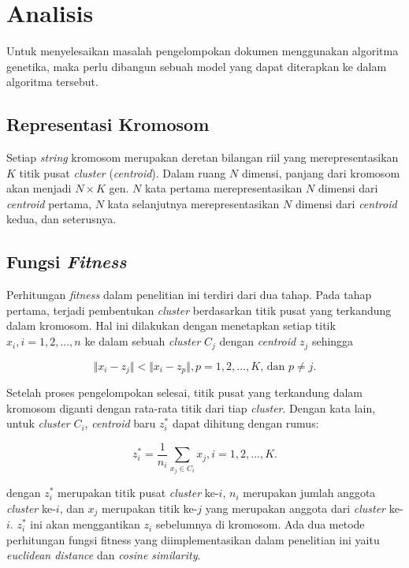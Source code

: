 \chapter{Analisis}
\label{chap:analisis}

Untuk menyelesaikan masalah pengelompokan dokumen menggunakan algoritma genetika, maka perlu dibangun sebuah model yang dapat diterapkan ke dalam algoritma tersebut.

\section{Representasi Kromosom}
Setiap \textit{string} kromosom merupakan deretan bilangan riil yang merepresentasikan $K$ titik pusat \textit{cluster} (\textit{centroid}). Dalam ruang $N$ dimensi, panjang dari kromosom akan menjadi $N\times K$ gen. $N$ kata pertama merepresentasikan $N$ dimensi dari \textit{centroid} pertama, $N$ kata selanjutnya merepresentasikan $N$ dimensi dari \textit{centroid} kedua, dan seterusnya.

\section{Fungsi \textit{Fitness}}
Perhitungan \textit{fitness} dalam penelitian ini terdiri dari dua tahap. Pada tahap pertama, terjadi pembentukan \textit{cluster} berdasarkan titik pusat yang terkandung dalam kromosom. Hal ini dilakukan dengan menetapkan setiap titik $x_i,i=1,2, ... ,n$ ke dalam sebuah \textit{cluster} $C_j$ dengan \textit{centroid} $z_j$ sehingga

\begin{equation}
\Vert x_i-z_j \Vert < \Vert x_i-z_p \Vert , p=1,2, ... ,K \mbox{, dan } p \neq j.
\end{equation}

Setelah proses pengelompokan selesai, titik pusat yang terkandung dalam kromosom diganti dengan rata-rata titik dari tiap \textit{cluster}. Dengan kata lain, untuk \textit{cluster} $C_i$, \textit{centroid} baru $z_i^*$ dapat dihitung dengan rumus:

\begin{equation}
z_i^*=\frac{1}{n_i} \sum_{x_j\in C_i} x_j,   i=1,2, ... ,K.
\end{equation}

dengan $z_i^*$ merupakan titik pusat \textit{cluster} ke-$i$, $n_i$ merupakan jumlah anggota \textit{cluster} ke-$i$, dan $x_j$ merupakan titik ke-$j$ yang merupakan anggota dari \textit{cluster} ke-$i$. $z_i^*$ ini akan menggantikan $z_i$ sebelumnya di kromosom. Ada dua metode perhitungan fungsi fitness yang diimplementasikan dalam penelitian ini yaitu \textit{euclidean distance} dan \textit{cosine similarity}.

